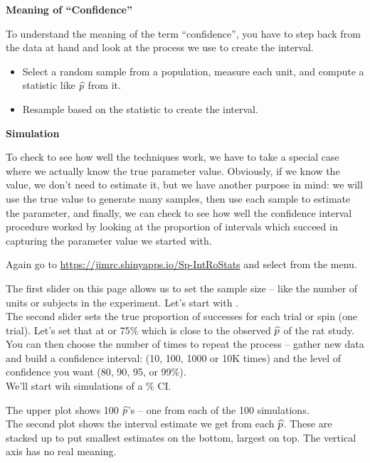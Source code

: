 
\def\theTopic{Confidence }
\def\dayNum{7}

\begin{center}
  {\Large\bf Meaning of ``Confidence''}
\end{center}

To understand the meaning of the term ``confidence'', you have to step
back from the data at hand and look at the process we use to create
the interval.
\begin{itemize}
  \item Select a random sample from a population, measure each unit,
    and compute a  statistic like $\widehat{p}$ from it.
  \item Resample based on the statistic to create the interval.
  \end{itemize}

  \begin{center}
    {\large \bf Simulation}
  \end{center}

To check to see how well the techniques work, we have to take a
 special case where we actually know the true parameter value.
 Obviously, if we know the value, we don't need to estimate it, but we
 have another purpose in mind: we will use the true value to generate
 many samples, then use each sample to estimate the parameter, and
 finally, we can check to see how well the confidence interval
 procedure worked by looking at the proportion of intervals which
 succeed in capturing the parameter value we started with.

 Again go to \url{https://jimrc.shinyapps.io/Sp-IntRoStats}
 and select  from the  menu.
 
 The first slider on this page allows us to set the sample size --
 like the number of units or subjects in the experiment.  Let's start with
 .\\
 The second slider sets the true proportion of successes for each
 trial or spin (one trial).  Let's set that at  or 75\%
 which is close to the observed $\widehat{p}$ of the rat study.\\
 You can then choose the number of times to repeat the process -- gather
 new data and build a confidence interval: (10, 100, 1000 or 10K
 times) and the level of confidence you want (80, 90, 95, or 99\%).\\
 We'll start wih  simulations of a \% CI.

  The upper plot shows 100  $\widehat{p}$'s -- one from each of the 100 simulations.
  \\
  The second plot shows the interval estimate we get from each
  $\widehat{p}$.  These  are stacked up to put smallest estimates on the
  bottom, largest on top. The vertical axis has no real meaning. 


